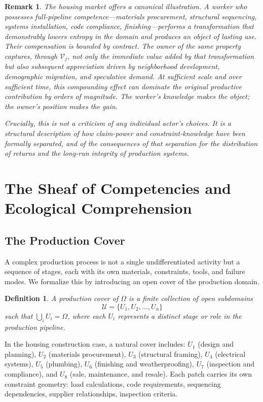 \documentclass[12pt]{article}
\newtheorem{definition}{Definition}
\newtheorem{remark}{Remark}
\begin{document}
\begin{remark}
The housing market offers a canonical illustration. A worker who possesses full-pipeline competence---materials procurement, structural sequencing, systems installation, code compliance, finishing---performs a transformation that demonstrably lowers entropy in the domain and produces an object of lasting use. Their compensation is bounded by contract. The owner of the same property captures, through $\mathcal{V}_j$, not only the immediate value added by that transformation but also subsequent appreciation driven by neighborhood development, demographic migration, and speculative demand. At sufficient scale and over sufficient time, this compounding effect can dominate the original productive contribution by orders of magnitude. The worker's knowledge makes the object; the owner's position makes the gain.

Crucially, this is not a criticism of any individual actor's choices. It is a structural description of how claim-power and constraint-knowledge have been formally separated, and of the consequences of that separation for the distribution of returns and the long-run integrity of production systems.
\end{remark}


\section{The Sheaf of Competencies and Ecological Comprehension}

\subsection{The Production Cover}

A complex production process is not a single undifferentiated activity but a sequence of stages, each with its own materials, constraints, tools, and failure modes. We formalize this by introducing an open cover of the production domain.

\begin{definition}
A \emph{production cover} of $\Omega$ is a finite collection of open subdomains
\[
\mathcal{U} = \{U_1, U_2, \ldots, U_n\}
\]
such that $\bigcup_i U_i = \Omega$, where each $U_i$ represents a distinct stage or role in the production pipeline.
\end{definition}

In the housing construction case, a natural cover includes: $U_1$ (design and planning), $U_2$ (materials procurement), $U_3$ (structural framing), $U_4$ (electrical systems), $U_5$ (plumbing), $U_6$ (finishing and weatherproofing), $U_7$ (inspection and compliance), and $U_8$ (sale, maintenance, and resale). Each patch carries its own constraint geometry: load calculations, code requirements, sequencing dependencies, supplier relationships, inspection criteria.
\end{document}
